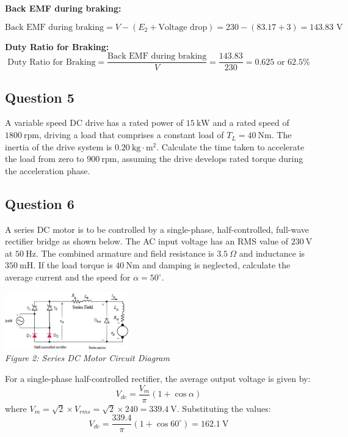 \documentclass[12pt]{report}
\begin{document}
	
	\textbf{Back EMF during braking:}
	
	\[
	\text{Back EMF during braking} = V - (E_2 + \text{Voltage drop}) = 230 - (83.17 + 3) = 143.83 \text{ V}\]
	
	\textbf{Duty Ratio for Braking:}
	\[
	\text{Duty Ratio for Braking} = \frac{\text{Back EMF during braking}}{V} = \frac{143.83}{230} = 0.625 \text{ or } 62.5\%
	\]
	
	
	
	
	\subsection*{Question 5}
	A variable speed DC drive has a rated power of $15 \ \text{kW}$ and a rated speed of $1800 \ \text{rpm}$, driving a load that comprises a constant load of $T_L = 40 \ \text{Nm}$. The inertia of the drive system is $0.20 \ \text{kg} \cdot \text{m}^2$. Calculate the time taken to accelerate the load from zero to $900 \ \text{rpm}$, assuming the drive develops rated torque during the acceleration phase.
	
	
	
	
	
	
	
	
	
	\subsection*{Question 6}
	A series DC motor is to be controlled by a single-phase, half-controlled, full-wave rectifier bridge as shown below. The AC input voltage has an RMS value of $230 \ \text{V}$ at $50 \ \text{Hz}$. The combined armature and field resistance is $3.5 \ \Omega$ and inductance is $350 \ \text{mH}$. If the load torque is $40 \ \text{Nm}$ and damping is neglected, calculate the average current and the speed for $\alpha = 50^\circ$.
	
	\begin{center}
		\includegraphics[width=0.4\textwidth]{Picture2.png}
		\\[1em]
		\textit{Figure 2: Series DC Motor Circuit Diagram}
	\end{center}
	
	
	
	\noindent For a single-phase half-controlled rectifier, the average output voltage is given by:
	\[V_{dc} = \frac{V_m}{\pi} (1 + \cos \alpha)\]
	where \(V_m = \sqrt{2} \times V_{rms} = \sqrt{2} \times 240 = 339.4\ \text{V}\). Substituting the values:
	\[V_{dc} = \frac{339.4}{\pi} (1 + \cos 60^\circ) = 162.1\ \text{V}\]
	
\end{document}
